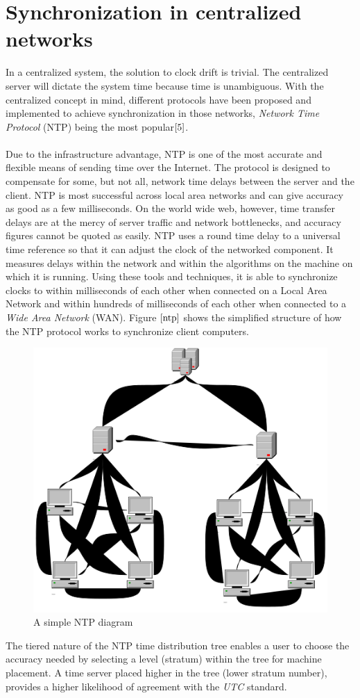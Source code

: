 \documentclass[a4paper,10pt]{report}
\begin{document}
\section{\textbf{Synchronization in centralized networks}}
In a centralized system, the solution to clock drift is trivial. The
centralized server will dictate the system time because time is
unambiguous. With the centralized concept in mind, different
protocols have been proposed and implemented to achieve
synchronization in those networks, \textit{Network Time Protocol}
(NTP) being the most
popular$\cite{5}$.
\paragraph*{}
Due to the infrastructure advantage, NTP is one of the most accurate
and flexible means of sending time over the Internet. The protocol
is designed to compensate for some, but not all, network time delays
between the server and the client. NTP is most successful across
local area networks and can give accuracy as good as a few
milliseconds. On the world wide web, however, time transfer delays
are at the mercy of server traffic and network bottlenecks, and
accuracy figures cannot be quoted as easily. NTP uses a round time
delay to a universal time reference so that it can adjust the clock
of the networked component. It measures delays within the network
and within the algorithms on the machine on which it is running.
Using  these tools and techniques, it is able to synchronize clocks
to within milliseconds of each other when connected on a Local Area
Network and within hundreds of milliseconds of each other when
connected to a \textit{Wide Area Network}
(WAN). Figure $\ref{ntp}$ shows
the simplified structure of how the NTP protocol works to
synchronize client computers.
\begin{figure}
\centering
\includegraphics[width= 0.5 \textwidth]{ntp}
\caption{A simple NTP diagram} \label{ntp}
\end{figure}
The tiered nature of the NTP time distribution tree enables a user to
 choose the accuracy needed by selecting a level (stratum) within
the tree for machine placement. A time server placed higher in the
tree (lower stratum number), provides a higher likelihood of
agreement with the \textit{UTC} standard.
\end{document}
